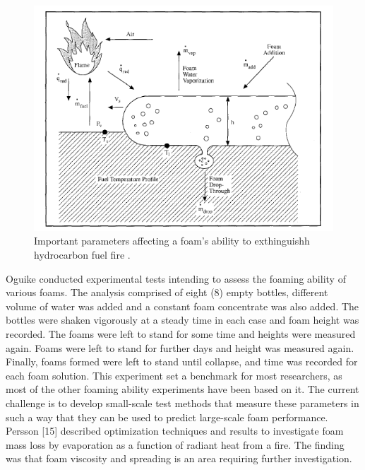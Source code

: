 \documentclass[12pt]{report}
\begin{document}
\begin{figure}[H]
    \centering
    \includegraphics[width=\textwidth]{important_parameters.png}
    \caption{Important parameters affecting a foam's ability to exthinguishh hydrocarbon fuel fire \cite{scheffey1995evaluating}.}
    \label{ch2:figure:parameters}
\end{figure}

Oguike \cite{oguike2013study} conducted experimental tests intending to assess the foaming ability of various foams. The analysis comprised of eight (8) empty bottles, different volume of water was added and a constant foam concentrate was also added. The bottles were shaken vigorously at a steady time in each case and foam height was recorded. The foams were left to stand for some time and heights were measured again. Foams were left to stand for further days and height was measured again. Finally, foams formed were left to stand until collapse, and time was recorded for each foam solution. This experiment set a benchmark for most researchers, as most of the other foaming ability experiments have been based on it.
The current challenge is to develop small-scale test methods that measure these parameters in such a way that they can be used to predict large-scale foam performance. Persson [15] described optimization techniques and results to investigate foam mass loss by evaporation as a function of radiant heat from a fire. The finding was that foam viscosity and spreading is an area requiring further investigation. 
\end{document}
